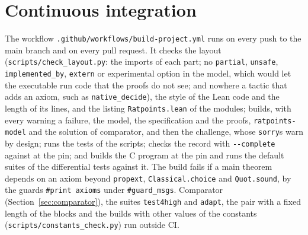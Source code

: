 \section{Continuous integration}\label{sec:ccodeCI}

The workflow \verb|.github/workflows/build-project.yml| runs on every push to the main branch and on
every pull request. It checks the layout (\verb|scripts/check_layout.py|: the imports of each part;
no \verb|partial|, \verb|unsafe|, \verb|implemented_by|, \verb|extern| or experimental option in the
model, which would let the executable run code that the proofs do not see; and nowhere a tactic that
adds an axiom, such as \verb|native_decide|), the style of the Lean code and the length of its
lines, and the listing \verb|Ratpoints.lean| of the modules; builds, with every warning a failure,
the model, the specification and the proofs, \verb|ratpoints-model| and the solution of comparator,
and then the challenge, whose \verb|sorry|s warn by design; runs the tests of the scripts; checks
the record with \verb|--complete| against \ratpoints{} at the pin; and builds the C program at the pin
and runs the default suites of the differential tests against it. The build fails if a main theorem
depends on an axiom beyond \verb|propext|, \verb|Classical.choice| and \verb|Quot.sound|, by the
guards \verb|#print axioms| under \verb|#guard_msgs|. Comparator (Section~\ref{sec:comparator}),
the suites \verb|test4high| and \verb|adapt|, the pair with a fixed length of the blocks and the
builds with other values of the constants (\verb|scripts/constants_check.py|) run outside CI.
